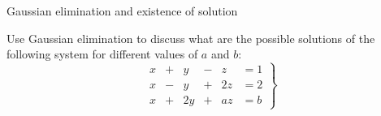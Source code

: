 \documentclass[9pt]{beamer}
\begin{document}
\begin{frame}{Gaussian elimination and existence of solution}

    Use Gaussian elimination to discuss what are the possible solutions of the following system for different values of $a$ and $b$:
    \begin{equation*}
        \left.
        \begin{alignedat}{4}
             x & {}+{} &  y & {}-{} &  z & = 1 \\
             x & {}-{} &  y & {}+{} & 2z & = 2 \\
             x & {}+{} & 2y & {}+{} & az & = b
        \end{alignedat}
        \right\}
    \end{equation*}
    
\end{frame}
\end{document}
